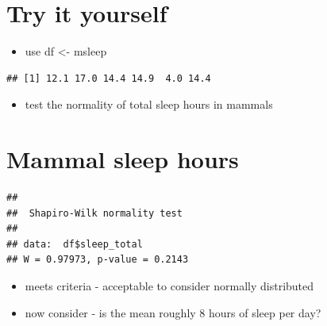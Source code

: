 \documentclass[
]{book}
\newenvironment{Shaded}{\begin{snugshade}}{\end{snugshade}}
\newcommand{\KeywordTok}[1]{\textcolor[rgb]{0.13,0.29,0.53}{\textbf{#1}}}
\newcommand{\NormalTok}[1]{#1}
\newcommand{\OperatorTok}[1]{\textcolor[rgb]{0.81,0.36,0.00}{\textbf{#1}}}
\newcommand{\StringTok}[1]{\textcolor[rgb]{0.31,0.60,0.02}{#1}}
\providecommand{\tightlist}{%
  \setlength{\itemsep}{0pt}\setlength{\parskip}{0pt}}
\begin{document}
\hypertarget{try-it-yourself-1}{%
\section{Try it yourself}\label{try-it-yourself-1}}

\begin{itemize}
\tightlist
\item
  use df \textless- msleep
\end{itemize}

\begin{Shaded}
\end{Shaded}

\begin{verbatim}
## [1] 12.1 17.0 14.4 14.9  4.0 14.4
\end{verbatim}

\begin{itemize}
\tightlist
\item
  test the normality of total sleep hours in mammals
\end{itemize}

\hypertarget{mammal-sleep-hours-1}{%
\section{Mammal sleep hours}\label{mammal-sleep-hours-1}}

\begin{Shaded}
\end{Shaded}

\begin{verbatim}
## 
##  Shapiro-Wilk normality test
## 
## data:  df$sleep_total
## W = 0.97973, p-value = 0.2143
\end{verbatim}

\begin{itemize}
\tightlist
\item
  meets criteria - acceptable to consider normally distributed
\item
  now consider - is the mean roughly 8 hours of sleep per day?
\end{itemize}
\end{document}
